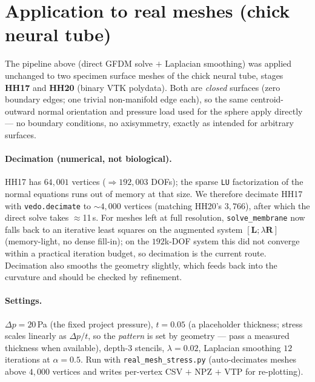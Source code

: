 \documentclass[11pt]{article}
\begin{document}
\section{Application to real meshes (chick neural tube)}\label{sec:realmesh}

The pipeline above (direct GFDM solve $+$ Laplacian smoothing) was applied unchanged to two
specimen surface meshes of the chick neural tube, stages \textbf{HH17} and \textbf{HH20}
(binary VTK polydata). Both are \emph{closed} surfaces (zero boundary edges; one trivial
non-manifold edge each), so the same centroid-outward normal orientation and pressure load
used for the sphere apply directly --- no boundary conditions, no axisymmetry, exactly as
intended for arbitrary surfaces.

\paragraph{Decimation (numerical, not biological).} HH17 has $64{,}001$ vertices
($\Rightarrow192{,}003$ DOFs); the sparse \texttt{LU} factorization of the normal equations
runs out of memory at that size. We therefore decimate HH17 with \texttt{vedo.decimate} to
$\sim\!4{,}000$ vertices (matching HH20's $3{,}766$), after which the direct solve takes
$\approx$11\,s. For meshes left at full resolution, \texttt{solve\_membrane} now falls back
to an iterative least squares on the augmented system $[\mathbf L;\lambda\mathbf R]$
(memory-light, no dense fill-in); on the $192$k-DOF system this did not converge within a
practical iteration budget, so decimation is the current route. Decimation also smooths the
geometry slightly, which feeds back into the curvature and should be checked by refinement.

\paragraph{Settings.} $\Delta p=20$\,Pa (the fixed project pressure), $t=0.05$ (a placeholder
thickness; stress scales linearly as $\Delta p/t$, so the \emph{pattern} is set by geometry ---
pass a measured thickness when available), depth-3 stencils, $\lambda=0.02$, Laplacian
smoothing $12$ iterations at
$\alpha=0.5$. Run with \texttt{real\_mesh\_stress.py} (auto-decimates meshes above
$4{,}000$ vertices and writes per-vertex CSV $+$ NPZ $+$ VTP for re-plotting).
\end{document}
